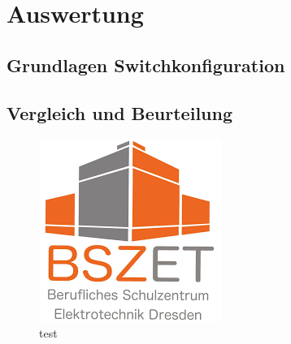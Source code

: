 \documentclass[a4paper, 11pt]{scrartcl}
\begin{document}
    \newpage
    \section{Auswertung}
    \subsection{Grundlagen Switchkonfiguration}
    \subsection{Vergleich und Beurteilung}
    
    \begin{figure}[ht]
        \centering
        \includegraphics[scale=0.6]{bszet-lgo.png}
        \caption{test}
    \end{figure}

    \newpage
    \printbibliography

    \newpage

    \newpage
    \listoffigures 

    \newpage
    
    \newpage
\end{document}
